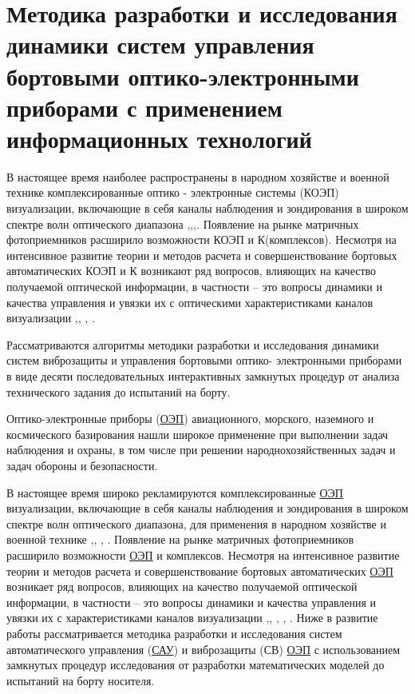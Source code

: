 \chapter{Методика разработки и исследования динамики систем управления бортовыми оптико-электронными приборами с применением информационных технологий} \label{ch:ch2}

В настоящее время наиболее распространены в народном хозяйстве и военной технике комплексированные оптико - электронные системы (КОЭП) визуализации, включающие в себя каналы наблюдения и зондирования в широком спектре волн оптического диапазона \cite[]{Tarasov},\cite[]{Belyakov},\cite[]{Karpov},\cite[]{Torshina}. Появление на рынке матричных фотоприемников расширило возможности КОЭП и К(комплексов). Несмотря на интенсивное развитие теории и методов расчета и совершенствование бортовых автоматических КОЭП и К возникают ряд вопросов, влияющих на качество получаемой оптической информации, в частности – это вопросы динамики и качества управления и увязки их с оптическими характеристиками каналов визуализации \cite[]{Belyakov},\cite[]{Karpov}, \cite[]{Baloev16}, \cite[]{Karpov17}.

Рассматриваются алгоритмы методики разработки и исследования динамики систем виброзащиты и управления бортовыми оптико- электронными приборами в виде десяти последовательных интерактивных замкнутых процедур от анализа технического задания до испытаний на борту.

Оптико-электронные приборы (\hyperref[acroEOS]{ОЭП}) авиационного, морского, наземного и космического базирования нашли широкое применение при выполнении задач наблюдения и охраны, в том числе при решении народнохозяйственных задач и задач обороны и безопасности.

В настоящее время широко рекламируются комплексированные \hyperref[acroEOS]{ОЭП} визуализации, включающие в себя каналы наблюдения и зондирования в широком спектре волн оптического диапазона, для применения в народном хозяйстве и военной технике \cite[]{Tarasov},\cite[]{Belyakov}, \cite[]{Torshina}, \cite[]{Ivanov18}. Появление на рынке матричных фотоприемников расширило возможности \hyperref[acroEOS]{ОЭП} и комплексов. Несмотря на интенсивное развитие теории и методов расчета и совершенствование бортовых автоматических \hyperref[acroEOS]{ОЭП} возникает ряд вопросов, влияющих на качество получаемой оптической информации, в частности – это вопросы динамики и качества управления и увязки их с характеристиками каналов визуализации \cite[]{Tarasov},\cite[]{Belyakov}, \cite[]{Baloev16}, \cite[]{Karpov17}, \cite[]{Gerasin19}. Ниже в развитие работы \cite[]{Tarasov} рассматривается методика разработки и исследования систем автоматического управления (\hyperref[acroSAU]{САУ}) и виброзащиты (СВ) \hyperref[acroEOS]{ОЭП} с использованием замкнутых процедур исследования от разработки математических моделей до испытаний на борту носителя.


